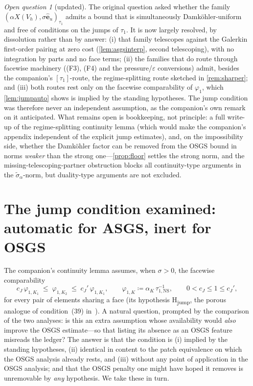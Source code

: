 \documentclass[11pt]{article}
\theoremstyle{remark}
\newtheorem{question}[theorem]{Open question}
\newcommand{\tns}{\tau_{1,\mathrm{NS}}}
\newcommand{\st}{\widetilde{\sigma}_\alpha}
\begin{document}
\begin{question}[updated]
\label{q:open}
The original question asked whether the family
$(\alpha X(V_h), \sigma\hat{\boldsymbol e}_u)_{\tau_1}$ admits a bound that is
simultaneously Damk\"ohler-uniform and free of conditions on the jumps of
$\tau_1$.
It is now largely resolved, by dissolution rather than by answer: (i) that family
telescopes against the Galerkin first-order pairing at zero cost
(\cref{lem:asgsinterp}, second telescoping), with no integration by parts and no
face terms; (ii) the families that do route through facewise machinery ((F3), (F4)
and the pressure/$\varepsilon$ conversions) admit, besides the companion's
$[\tau_1]$-route, the regime-splitting route sketched in \cref{rem:sharper}; and
(iii) both routes rest only on the facewise comparability of $\varphi_1$, which
\cref{lem:jumpauto} shows is implied by the standing hypotheses. The jump condition
was therefore never an independent assumption, as the companion's own remark on it
anticipated. What remains open is bookkeeping, not principle: a full write-up of the
regime-splitting continuity lemma (which would make the companion's appendix
independent of the explicit jump estimates), and, on the impossibility side, whether
the Damk\"ohler factor can be removed from the OSGS bound in norms \emph{weaker}
than the strong one---\cref{prop:floor} settles the strong norm, and the
missing-telescoping-partner obstruction blocks all continuity-type arguments in the
$\st$-norm, but duality-type arguments are not excluded.
\end{question}

\section{The jump condition examined: automatic for ASGS, inert for OSGS}
\label{sec:jump}

The companion's continuity lemma assumes, when $\sigma > 0$, the facewise
comparability
\begin{equation}\label{eq:Hjump}
  c_J\,\varphi_{1,K_1} \;\le\; \varphi_{1,K_2} \;\le\; c_J'\,\varphi_{1,K_1},
  \qquad \varphi_{1,K} \coloneqq \alpha_K\,\tns^{-1},
  \qquad 0 < c_J \le 1 \le c_J',
\end{equation}
for every pair of elements sharing a face (its hypothesis H\textsubscript{jump},
the porous analogue of condition~(39) in~\cite{Codina2001}). A natural question,
prompted by the comparison of the two analyses: is this an extra assumption whose
availability would \emph{also} improve the OSGS estimate---so that listing its
absence as an OSGS feature misreads the ledger? The answer is that the condition is
(i) implied by the standing hypotheses, (ii) identical in content to the patch
equivalence on which the OSGS analysis already rests, and (iii) without any point of
application in the OSGS analysis; and that the OSGS penalty one might have hoped it
removes is unremovable by \emph{any} hypothesis. We take these in turn.
\end{document}
